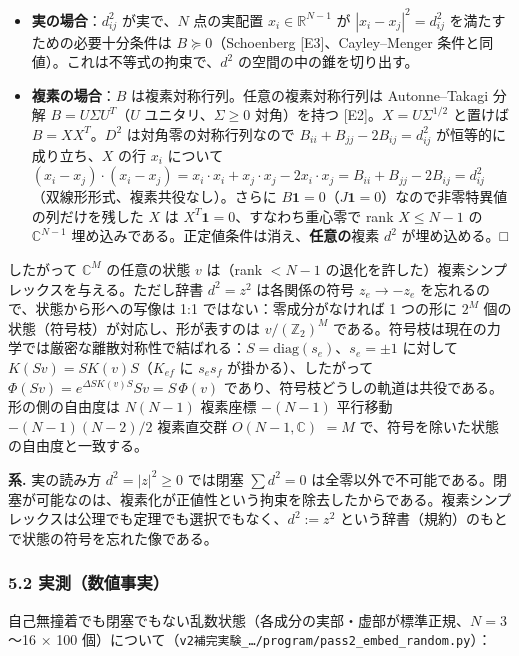 \documentclass[
  10pt,
  a4paper,
]{ltjsarticle}
\providecommand{\tightlist}{%
  \setlength{\itemsep}{0pt}\setlength{\parskip}{0pt}}
\begin{document}
\begin{itemize}
\tightlist
\item
  \textbf{実の場合}：\(d^2_{ij}\) が実で、\(N\) 点の実配置
  \(x_i\in\mathbb R^{N-1}\) が \(|x_i-x_j|^2=d^2_{ij}\)
  を満たすための必要十分条件は \(B\succeq0\)（Schoenberg
  {[}E3{]}、Cayley--Menger 条件と同値）。これは不等式の拘束で、\(d^2\)
  の空間の中の錐を切り出す。
\item
  \textbf{複素の場合}：\(B\) は複素対称行列。任意の複素対称行列は
  Autonne--Takagi 分解 \(B=U\Sigma U^T\)（\(U\) ユニタリ、\(\Sigma\ge0\)
  対角）を持つ {[}E2{]}。\(X=U\Sigma^{1/2}\) と置けば
  \(B=XX^T\)。\(D^2\) は対角零の対称行列なので
  \(B_{ii}+B_{jj}-2B_{ij}=d^2_{ij}\) が恒等的に成り立ち、\(X\) の行
  \(x_i\) について
  \((x_i-x_j)\cdot(x_i-x_j)=x_i\cdot x_i+x_j\cdot x_j-2x_i\cdot x_j=B_{ii}+B_{jj}-2B_{ij}=d^2_{ij}\)（双線形形式、複素共役なし）。さらに
  \(B\mathbf 1=0\)（\(J\mathbf1=0\)）なので非零特異値の列だけを残した
  \(X\) は \(X^T\mathbf1=0\)、すなわち重心零で rank \(X\le N-1\) の
  \(\mathbb C^{N-1}\)
  埋め込みである。正定値条件は消え、\textbf{任意の}複素 \(d^2\)
  が埋め込める。□
\end{itemize}

したがって \(\mathbb C^M\) の任意の状態 \(v\) は（rank \(<N-1\)
の退化を許した）複素シンプレックスを与える。ただし辞書 \(d^2=z^2\)
は各関係の符号 \(z_e\to-z_e\) を忘れるので、状態から形への写像は 1:1
ではない：零成分がなければ 1 つの形に \(2^M\)
個の状態（符号枝）が対応し、形が表すのは \(v/(\mathbb Z_2)^M\)
である。符号枝は現在の力学では厳密な離散対称性で結ばれる：\(S=\mathrm{diag}(s_e)\)、\(s_e=\pm1\)
に対して \(K(Sv)=SK(v)S\)（\(K_{ef}\) に \(s_es_f\)
が掛かる）、したがって \(\Phi(Sv)=e^{\Delta SK(v)S}Sv=S\,\Phi(v)\)
であり、符号枝どうしの軌道は共役である。形の側の自由度は \(N(N-1)\)
複素座標 \(-(N-1)\) 平行移動 \(-(N-1)(N-2)/2\) 複素直交群
\(O(N-1,\mathbb C)\) \(=M\) で、符号を除いた状態の自由度と一致する。

\textbf{系.} 実の読み方 \(d^2=|z|^2\ge0\) では閉塞 \(\sum d^2=0\)
は全零以外で不可能である。閉塞が可能なのは、複素化が正値性という拘束を除去したからである。複素シンプレックスは公理でも定理でも選択でもなく、\(d^2:=z^2\)
という辞書（規約）のもとで状態の符号を忘れた像である。

\subsubsection{5.2
実測（数値事実）}\label{ux5b9fux6e2cux6570ux5024ux4e8bux5b9f-1}

自己無撞着でも閉塞でもない乱数状態（各成分の実部・虚部が標準正規、\(N=3\)〜16
× 100
個）について（\texttt{v2補完実験\_…/program/pass2\_embed\_random.py}）：
\end{document}
